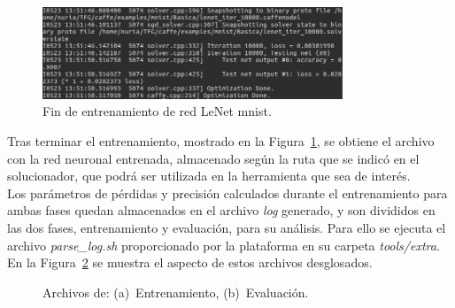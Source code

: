 	\begin{figure}[H]
		\begin{center}
			\includegraphics[width=0.8\textwidth]{figures/RedBasicaFin}
			\caption{Fin de entrenamiento de red LeNet \acrshort{mnist}.}
			\label{fig.finEntrBas}
		\end{center}
	\end{figure}
	
	Tras terminar el entrenamiento, mostrado en la Figura~\ref{fig.finEntrBas}, se obtiene el archivo con la red neuronal entrenada, almacenado según la ruta que se indicó en el solucionador, que podrá ser utilizada en la herramienta que sea de interés.\\

	Los parámetros de pérdidas y precisión calculados durante el entrenamiento para ambas fases quedan almacenados en el archivo \textit{log} generado, y son divididos en las dos fases, entrenamiento y evaluación, para su análisis. Para ello se ejecuta el archivo \textit{parse\_log.sh} proporcionado por la plataforma en su carpeta \textit{tools/extra}. En la Figura~\ref{fig.parse} se muestra el aspecto de estos archivos desglosados.
	\vspace{10pt}
	
	\begin{figure}[H]
			\centering
			\caption{Archivos  de: (a)~Entrenamiento, (b)~Evaluación.}
			\label{fig.parse}
	\end{figure}

